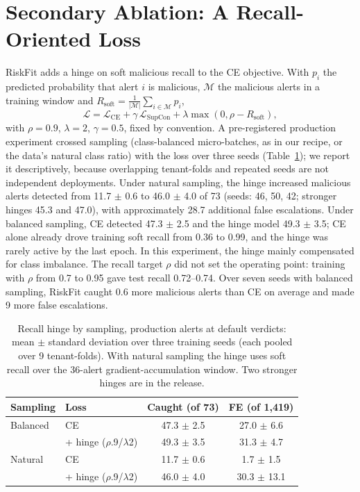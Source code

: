 \documentclass[letterpaper]{article} %
\begin{document}
\section{Secondary Ablation: A Recall-Oriented Loss}

RiskFit adds a hinge on soft malicious recall to the CE objective. With $p_i$ the predicted probability that alert $i$ is malicious, $\mathcal{M}$ the malicious alerts in a training window and $R_{\text{soft}}=\frac{1}{|\mathcal{M}|}\sum_{i\in\mathcal{M}}p_i$,
\begin{equation}
\mathcal{L} = \mathcal{L}_{\text{CE}} + \gamma\,\mathcal{L}_{\text{SupCon}} + \lambda \max(0, \rho - R_{\text{soft}}),
\label{eq:riskfit}
\end{equation}
with $\rho{=}0.9$, $\lambda{=}2$, $\gamma{=}0.5$, fixed by convention. A pre-registered production experiment crossed sampling (class-balanced micro-batches, as in our recipe, or the data's natural class ratio) with the loss over three seeds (Table~\ref{tab:hinge}); we report it descriptively, because overlapping tenant-folds and repeated seeds are not independent deployments. Under natural sampling, the hinge increased malicious alerts detected from 11.7 $\pm$ 0.6 to 46.0 $\pm$ 4.0 of 73 (seeds: 46, 50, 42; stronger hinges 45.3 and 47.0), with approximately 28.7 additional false escalations. Under balanced sampling, CE detected 47.3 $\pm$ 2.5 and the hinge model 49.3 $\pm$ 3.5; CE alone already drove training soft recall from 0.36 to 0.99, and the hinge was rarely active by the last epoch. In this experiment, the hinge mainly compensated for class imbalance. The recall target $\rho$ did not set the operating point: training with $\rho$ from 0.7 to 0.95 gave test recall 0.72--0.74. Over seven seeds with balanced sampling, RiskFit caught 0.6 more malicious alerts than CE on average and made 9 more false escalations.

\begin{table}[t]
\centering
\small
\begin{tabular}{@{}llcc@{}}
\toprule
Sampling & Loss & Caught (of 73) & FE (of 1,419) \\
\midrule
Balanced & CE & 47.3 $\pm$ 2.5 & 27.0 $\pm$ 6.6 \\
 & + hinge ($\rho$.9/$\lambda$2) & 49.3 $\pm$ 3.5 & 31.3 $\pm$ 4.7 \\
Natural & CE & 11.7 $\pm$ 0.6 & \phantom{0}1.7 $\pm$ 1.5 \\
 & + hinge ($\rho$.9/$\lambda$2) & 46.0 $\pm$ 4.0 & 30.3 $\pm$ 13.1 \\
\bottomrule
\end{tabular}
\caption{Recall hinge by sampling, production alerts at default verdicts: mean $\pm$ standard deviation over three training seeds (each pooled over 9 tenant-folds). With natural sampling the hinge uses soft recall over the 36-alert gradient-accumulation window. Two stronger hinges are in the release.}
\label{tab:hinge}
\end{table}
\end{document}
